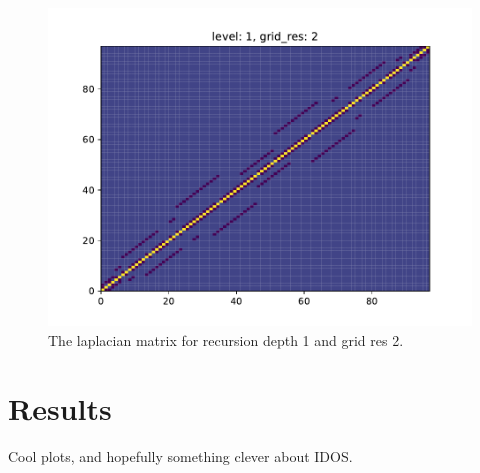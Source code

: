 \documentclass{article}
\begin{document}
\begin{figure}
    \includegraphics[width=\linewidth]{./media/laplacian_matrix.pdf}
    \caption{The laplacian matrix for recursion depth 1 and grid res 2.}
\end{figure}

\section{Results}
Cool plots, and hopefully something clever about IDOS.
\end{document}
